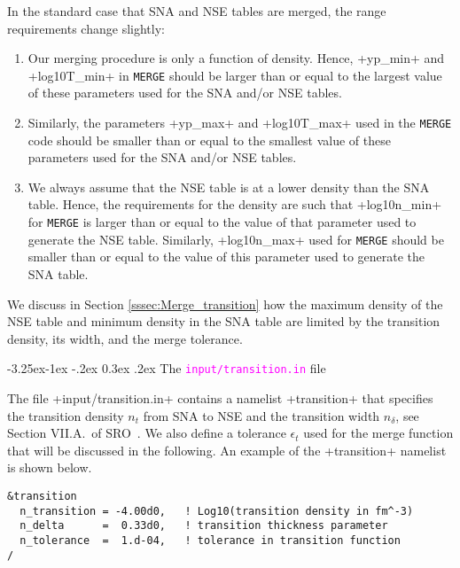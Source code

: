\documentclass[letterpaper,11pt]{refart}
\makeatletter
\renewcommand\subsubsection{\@startsection{subsubsection}{3}{\z@}%
                           {-3.25ex\@plus -1ex \@minus -.2ex}%
                           {0.3ex \@plus .2ex}%
                           {\normalfont\normalsize\bf\fontsize{11}{13}\selectfont}}
\makeatother
\begin{document}
In the standard case that SNA and NSE tables are merged, the range
requirements change slightly:

\begin{enumerate}[label=(\arabic*)]

  \item Our merging procedure is only a function of density. Hence,
    \verbprm+yp_min+ and \verbprm+log10T_min+ in \verb+MERGE+ should
    be larger than or equal to the largest value of these parameters
    used for the SNA and/or NSE tables.

\item Similarly, the parameters \verbprm+yp_max+ and
  \verbprm+log10T_max+ used in the \verb+MERGE+ code should be smaller than or equal to the smallest value of these parameters
  used for the SNA and/or NSE tables.

\item We always assume that the NSE table is at a lower density than
  the SNA table. Hence, the requirements for the density are such that
  \verbprm+log10n_min+ for \verb+MERGE+ is larger than or equal to the value of that parameter
  used to generate the NSE table. Similarly,
  \verbprm+log10n_max+ used for \verb+MERGE+ should be smaller than or equal to the value of this parameter
  used to generate the SNA table.

\end{enumerate}


We discuss in Section \ref{sssec:Merge_transition} how the maximum
density of the NSE table and minimum density in the SNA table are
limited by the transition density, its width, and the merge tolerance.


\subsubsection{The \texttt{\textcolor{magenta}{input/transition.in}} file}
\label{sssec:Merge_transition}

The file
\verbfile+input/transition.in+ contains a namelist \verbnml+transition+ that specifies
the transition density $n_t$ from SNA to NSE and the transition width
$n_\delta$, see Section VII.A.\ of SRO~\cite{schneider:17}. We also
define a tolerance $\epsilon_t$ used for the merge function that will
be discussed in the following.  An example of the \verbnml+transition+
namelist is shown below.


{\color{cyan}
\begin{verbatim}
&transition
  n_transition = -4.00d0,   ! Log10(transition density in fm^-3)
  n_delta      =  0.33d0,   ! transition thickness parameter
  n_tolerance  =  1.d-04,   ! tolerance in transition function
/
\end{verbatim}}
\end{document}

